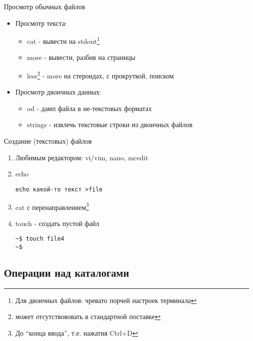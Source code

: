 \begin{frame}{Просмотр обычных файлов}
  \begin{itemize}
    \item Просмотр текста:
      \begin{itemize} 
	\item \alert{cat} - вывести на stdout\footnote{Для двоичных файлов: чревато порчей настроек терминала} \pause
	\item \alert{more} - вывести, разбив на страницы
	\item \alert{less}\footnote{может отсутствововать в стандартной поставке} - \alert{more} на стероидах, с прокруткой, поиском 
      \end{itemize} \pause
    \item Просмотр двоичных данных:
      \begin{itemize} 
	\item \alert{od} - дамп файла в не-текстовых форматах

        \item \alert{strings} - извлечь текстовые строки из двоичных файлов
      \end{itemize}
  \end{itemize}

\end{frame}

\begin{frame}[fragile]{Создание (текстовых) файлов}
  \pause
  \begin{enumerate}
    \item Любимым редактором: \alert{vi/vim}, \alert{nano}, \alert{mcedit} \pause
    \item \alert{echo}
\begin{lstlisting}[frame=single]
echo какой-то текст >file
\end{lstlisting}\pause
    \item \alert{cat} с перенаправлением\footnote{До ``конца ввода'', т.е. нажатия Ctrl+D}
 \pause
    \item \alert{touch} - создать пустой файл
\begin{lstlisting}[frame=single]
~$ touch file4
~$
\end{lstlisting}
  \end{enumerate}
\end{frame}

\subsection{Операции над каталогами}

